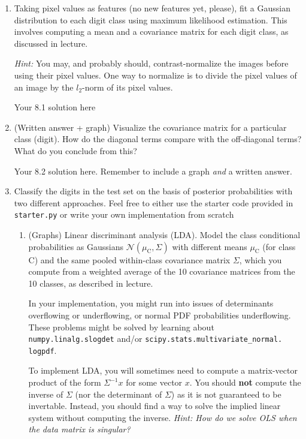 \documentclass[11pt]{article}
\begin{document}
\begin{enumerate}
\item Taking pixel values as features (no new features yet, please), fit a Gaussian distribution to each digit class using maximum likelihood estimation.  This involves computing a mean and a covariance matrix for each digit class, as discussed in lecture.

\emph{Hint:}  You may, and probably should, contrast-normalize the images before using their pixel values.  One way to normalize is to divide the pixel values of an image by the $l_2$-norm of its pixel values.

\begin{solution}
Your 8.1 solution here
\end{solution}
\item (Written answer + graph)  Visualize the covariance matrix for a particular class (digit).  How do the diagonal terms compare with the off-diagonal terms?  What do you conclude from this?

\begin{solution}
Your 8.2 solution here. Remember to include a graph \textit{and} a written answer.
\end{solution}

\item Classify the digits in the test set on the basis of posterior probabilities with two different approaches. Feel free to either use the starter code provided in {\tt starter.py} or write your own implementation from scratch


\begin{enumerate}
\item (Graphs) Linear discriminant analysis (LDA).  Model the class conditional probabilities as Gaussians $\mathcal{N}(\mu_\mathrm{C}, \Sigma)$ with different means $\mu_\mathrm{C}$ (for class C) and the same pooled within-class covariance matrix $\Sigma$, which you compute from a weighted average of the 10 covariance matrices from the 10 classes, as described in lecture.

In your implementation, you might run into issues of determinants overflowing or underflowing, or normal PDF probabilities underflowing. These problems might be solved by learning about {\tt numpy.linalg.slogdet} and/or {\tt scipy.stats.multivariate\_normal. logpdf}.

  To implement LDA, you will sometimes need to compute a matrix-vector product of the form $\Sigma^{-1} x$ for some vector $x$.  You should {\bf not} compute the inverse of $\Sigma$ (nor the determinant of $\Sigma$) as it is not guaranteed to be invertable. Instead, you should find a way to solve the implied linear system without computing the inverse. \emph{Hint: How do we solve OLS when the data matrix is singular?}


\end{enumerate}
\end{enumerate}
\end{document}

